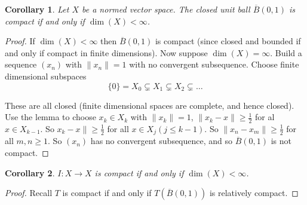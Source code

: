 \documentclass[10pt, oneside, reqno]{amsart}
\theoremstyle{plain}%
\newtheorem*{cor}{Corollary}
\theoremstyle{definition}
\theoremstyle{remark}
\begin{document}
\begin{cor}
	Let $X$ be a normed vector space.  The closed unit ball $\overline B(0, 1)$ is compact if and only if $\dim(X) < \infty$.  
\end{cor}
\begin{proof}
	If $\dim(X) < \infty$ then $\overline B(0, 1)$ is compact (since closed and bounded if and only if compact in finite dimensions).  Now suppose $\dim(X) = \infty$.  Build a sequence $(x_n)$ with $\| x_n \| = 1$ with no convergent subsequence.  Choose finite dimensional subspaces \[
		\{ 0 \} = X_0 \subsetneq X_1 \subsetneq X_2 \subsetneq \dots
	\]  
	
	These are all closed (finite dimensional spaces are complete, and hence closed).  Use the lemma to choose $x_k \in X_k$ with $\| x_k \| = 1$, $\| x_k - x \| \geq \frac{1}{2}$ for al $ x \in X_{k-1}$.  So $x_k - x \| \geq \frac{1}{2}$ for all $x \in X_j (j \leq k - 1)$.  So $\| x_n - x_m \| \geq \frac{1}{2}$ for all $m , n \geq 1$.  So $(x_n)$ has no convergent subsequence, and so $\overline B(0, 1)$ is not compact.  
\end{proof}
\begin{cor}
	$I : X \rightarrow X$ is compact if and only if $\dim(X) < \infty$.  
\end{cor}
\begin{proof}
	Recall $T$ is compact if and only if $T(\overline B(0, 1))$ is relatively compact.	
\end{proof}
\end{document}
